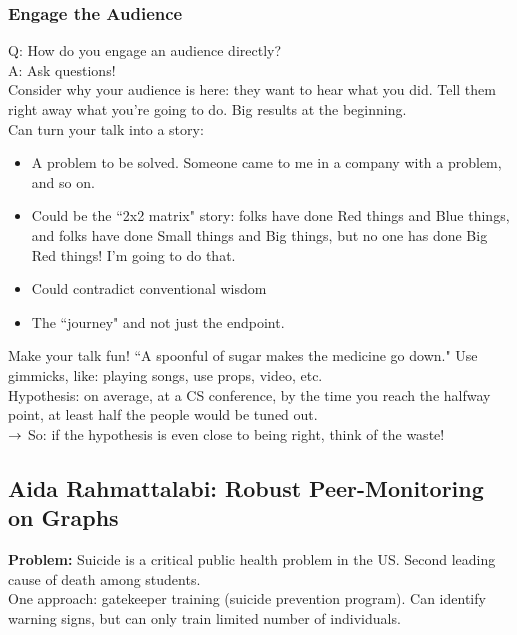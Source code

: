 \subsubsection{Engage the Audience}

Q: How do you engage an audience directly? \\

A: Ask questions! \\

Consider why your audience is here: they want to hear what you did. Tell them right away what you're going to do. Big results at the beginning. \\

Can turn your talk into a story:
\begin{itemize}
    \item A problem to be solved. Someone came to me in a company with a problem, and so on.
    \item Could be the ``2x2 matrix" story: folks have done Red things and Blue things, and folks have done Small things and Big things, but no one has done Big Red things! I'm going to do that.
    \item Could contradict conventional wisdom
    \item The ``journey" and not just the endpoint.
\end{itemize}

Make your talk fun! ``A spoonful of sugar makes the medicine go down." Use gimmicks, like: playing songs, use props, video, etc. \\

Hypothesis: on average, at a CS conference, by the time you reach the halfway point, at least half the people would be tuned out. \\

$\rightarrow$ So: if the hypothesis is even close to being right, think of the waste! \\

\spacerule
\subsection{Aida Rahmattalabi: Robust Peer-Monitoring on Graphs}

{\bf Problem:} Suicide is a critical public health problem in the US. Second leading cause of death among students. \\

One approach: gatekeeper training (suicide prevention program). Can identify warning signs, but can only train limited number of individuals. \\

